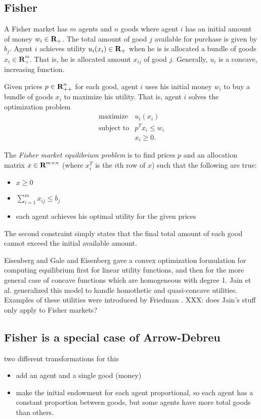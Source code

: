 \documentclass{article}
\begin{document}
\subsection{Fisher}

A Fisher market has $m$ agents and $n$ goods where
agent $i$ has an initial amount of money $w_i \in {\mbox{\bf R}}_+$.
The total amount of good $j$ available for purchase is given by $b_j$.
Agent $i$ achieves utility $u_i(x_i) \in {\mbox{\bf R}}_+$ when he is is allocated a bundle of goods $x_i \in \mathbf{R}^m_{+}$. That is, he is allocated amount $x_{ij}$ of good $j$.
Generally, $u_i$ is a concave, increasing function.

Given prices $p \in {\mbox{\bf R}}^n_{++}$ for each good, agent $i$ uses his initial money $w_i$ to buy a bundle of goods $x_i$ to maximize his utility. That is, agent $i$ solves the optimization problem
\[
\begin{array}{ll}
\mbox{maximize} & u_i(x_i) \\
\mbox{subject to} & p^T x_i \leq w_i \\
& x_i \geq 0.
\end{array}
\]

The \emph{Fisher market equilibrium problem} is to find prices $p$ and an allocation matrix $x \in {\mbox{\bf R}}^{m \times n}$ (where $x_i^T$ is the $i$th row of $x$) such that the following are true:
\begin{itemize}
\item $x \geq 0$
\item $\sum_{i=1}^m x_{ij} \leq b_j$
\item each agent achieves his optimal utility for the given prices
\end{itemize}

The second constraint simply states that the final total amount of each good cannot exceed the initial available amount.

Eisenberg and Gale \cite{eisenberg1959consensus, gale1960theory} and Eisenberg \cite{eisenberg1961aggregation} gave a convex optimization formulation
for computing equilibrium first for linear utility functions, and then for the more general case of concave functions which are homogeneous with degree 1. Jain et al. \cite{jain2005market} generalized this model to handle homothetic and quasi-concave utilities. Examples of these utilities were introduced by Friedman \cite{friedman1973concavity}. XXX: does Jain's stuff only apply to Fisher markets?

\subsection{Fisher is a special case of Arrow-Debreu}
two different transformations for this
\begin{itemize}
\item add an agent and a single good (money)
\item make the initial endowment for each agent proportional,
so each agent has a constant proportion between goods, but some agents have more total goods than others. 
\end{itemize}
\end{document}
